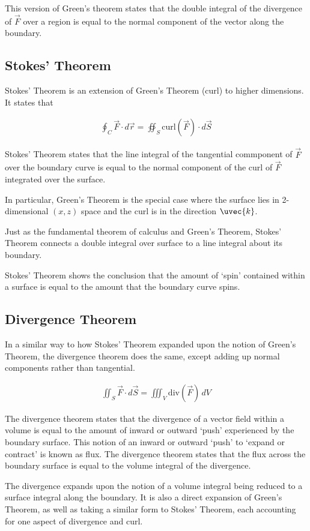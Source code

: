 \documentclass{notes}
\begin{document}
This version of Green's theorem states that the double integral of the divergence of \(\vec{F}\) over a region is equal to the normal component of the vector along the boundary.

\subsection*{Stokes' Theorem}

Stokes' Theorem is an extension of Green's Theorem (curl) to higher dimensions. It states that

\begin{gather}
    \oint_C \vec{F} \cdot d\vec{r} = \oiint_S \text{curl}(\vec{F})\cdot d\vec{S}
\end{gather}

Stokes' Theorem states that the line integral of the tangential commponent of \(\vec{F}\) over the boundary curve is equal to the normal component of the curl of \(\vec{F}\) integrated over the surface.

In particular, Green's Theorem is the special case where the surface lies in 2-dimensional \((x, z)\) space and the curl is in the direction \(\uvec{k}\).

Just as the fundamental theorem of calculus and Green's Theorem, Stokes' Theorem connects a double integral over surface to a line integral about its boundary.

Stokes' Theorem shows the conclusion that the amount of `spin' contained within a surface is equal to the amount that the boundary curve spins.

\subsection*{Divergence Theorem}

In a similar way to how Stokes' Theorem expanded upon the notion of Green's Theorem, the divergence theorem does the same, except adding up normal components rather than tangential.

\begin{gather}
    \iint_S \vec{F} \cdot d\vec{S} = \iiint_V \text{div}(\vec{F})\, dV
\end{gather}

The divergence theorem states that the divergence of a vector field within a volume is equal to the amount of inward or outward `push' experienced by the boundary surface. This notion of an inward or outward `push' to `expand or contract' is known as flux. The divergence theorem states that the flux across the boundary surface is equal to the volume integral of the divergence.

The divergence expands upon the notion of a volume integral being reduced to a surface integral along the boundary. It is also a direct expansion of Green's Theorem, as well as taking a similar form to Stokes' Theorem, each accounting for one aspect of divergence and curl.
\end{document}
